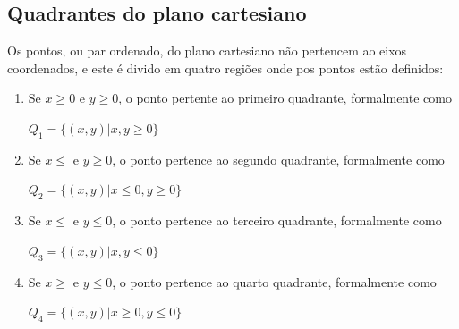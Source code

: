 \begin{multicols*}{2}
    \subsection{Quadrantes do plano cartesiano}
    Os pontos, ou par ordenado, do plano cartesiano não pertencem ao eixos coordenados, e este é divido em quatro regiões onde pos pontos estão definidos:
    \begin{enumerate}
        \item Se $x \ge 0$ e $y \ge 0$, o ponto pertente ao primeiro quadrante, formalmente como

              $Q_1 = \{ (x,y)| x,y \ge 0 \}$
        \item Se $x \le $ e $ y \ge 0 $, o ponto pertence ao segundo quadrante, formalmente como

              $Q_2 = \{  (x,y) | x \le 0, y \ge 0 \}$

        \item Se $x \le $ e $ y \le 0 $, o ponto pertence ao terceiro quadrante, formalmente como

              $Q_3 = \{  (x,y) | x , y \le 0 \}$

        \item Se $x \ge $ e $ y \le 0 $, o ponto pertence ao quarto quadrante, formalmente como

              $Q_4 = \{  (x,y) | x \ge 0 ,y \le 0 \}$
    \end{enumerate}


\end{multicols*}
